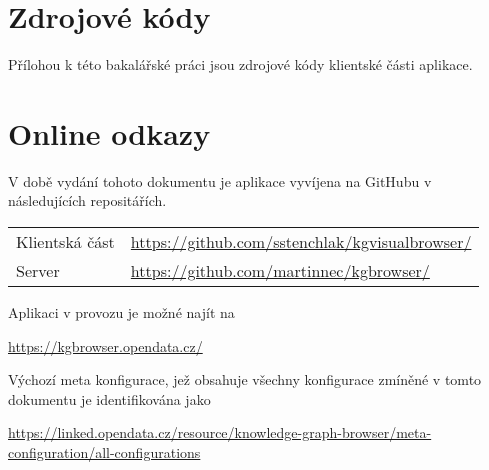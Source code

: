 \section{Zdrojové kódy}
Přílohou k této bakalářské práci jsou zdrojové kódy klientské části aplikace.

\section{Online odkazy}

\noindent V době vydání tohoto dokumentu je aplikace vyvíjena na GitHubu v následujících repositářích.

\begin{table}[!htbp]
\begin{tabular}{ll}
Klientská část & \url{https://github.com/sstenchlak/kgvisualbrowser/} \\
Server         & \url{https://github.com/martinnec/kgbrowser/}
\end{tabular}
\end{table}

\noindent Aplikaci v provozu je možné najít na

\smallskip

\begin{center}
\url{https://kgbrowser.opendata.cz/}
\end{center}

\smallskip

\noindent Výchozí meta konfigurace, jež obsahuje všechny konfigurace zmíněné v tomto dokumentu je identifikována jako
\smallskip

\begin{center}
\url{https://linked.opendata.cz/resource/knowledge-graph-browser/meta-configuration/all-configurations}
\end{center}
